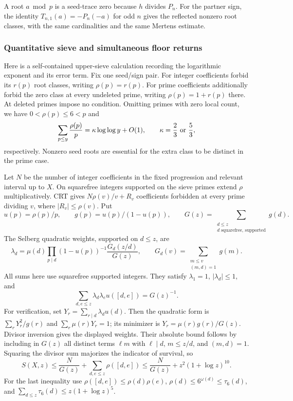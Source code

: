 \documentclass[11pt,a4paper]{article}
\theoremstyle{definition}\newtheorem{definition}[theorem]{Definition}
\theoremstyle{remark}\newtheorem{remark}[theorem]{Remark}
\begin{document}
A root $a\bmod p$ is a seed-trace zero because $h$ divides $P_n$.
For the partner sign, the identity
$T_{n,1}(a)=-P_n(-a)$ for odd $n$ gives the reflected nonzero root
classes, with the same cardinalities and the same Mertens estimate.

\subsubsection{Quantitative sieve and simultaneous floor returns}

Here is a self-contained upper-sieve calculation recording the
logarithmic exponent and its error term. Fix one seed/sign pair.
For integer coefficients forbid its $r(p)$ root classes, writing
$\rho(p)=r(p)$. For prime coefficients additionally forbid the zero
class at every undeleted prime, writing $\rho(p)=1+r(p)$ there.
At deleted primes impose no condition. Omitting primes with zero
local count, we have $0<\rho(p)\le6<p$ and
\[
 \sum_{p\le y}\frac{\rho(p)}p
  =\kappa\log\log y+O(1),\qquad
 \kappa=\frac23\ \hbox{or}\ \frac53,
\]
respectively. Nonzero seed roots are essential for the extra class
to be distinct in the prime case.

Let $N$ be the number of integer coefficients in the fixed progression
and relevant interval up to $X$. On squarefree integers supported on
the sieve primes extend $\rho$ multiplicatively. CRT gives
$N\rho(v)/v+R_v$ coefficients forbidden at every prime dividing $v$,
where $|R_v|\le\rho(v)$. Put
\[
 u(p)=\rho(p)/p,\qquad g(p)=u(p)/(1-u(p)),\qquad
 G(z)=\sum_{\substack{d\le z\\d\text{ squarefree, supported}}}g(d).
\]
The Selberg quadratic weights, supported on $d\le z$, are
\[
 \lambda_d=\mu(d)\prod_{p\mid d}(1-u(p))^{-1}
       \frac{G_d(z/d)}{G(z)},\qquad
 G_d(v)=\sum_{\substack{m\le v\\(m,d)=1}}g(m).
\]
All sums here use squarefree supported integers. They satisfy
$\lambda_1=1$, $|\lambda_d|\le1$, and
\[
 \sum_{d,e\le z}\lambda_d\lambda_e u([d,e])=G(z)^{-1}.
\]
For verification, set $Y_r=\sum_{r\mid d}\lambda_du(d)$.
Then the quadratic form is $\sum_rY_r^2/g(r)$ and
$\sum_r\mu(r)Y_r=1$; its minimizer is
$Y_r=\mu(r)g(r)/G(z)$. Divisor inversion gives the displayed weights.
Their absolute bound follows by including in $G(z)$ all distinct
terms $\ell m$ with $\ell\mid d$, $m\le z/d$, and $(m,d)=1$.
Squaring the divisor sum majorizes the indicator of survival, so
\[
 S(X,z)\le \frac{N}{G(z)}+
        \sum_{d,e\le z}\rho([d,e])
 \le\frac{N}{G(z)}+z^2(1+\log z)^{10}.
\]
For the last inequality use
$\rho([d,e])\le\rho(d)\rho(e)$,
$\rho(d)\le6^{\omega(d)}\le\tau_6(d)$, and
$\sum_{d\le z}\tau_6(d)\le z(1+\log z)^5$.
\end{document}
